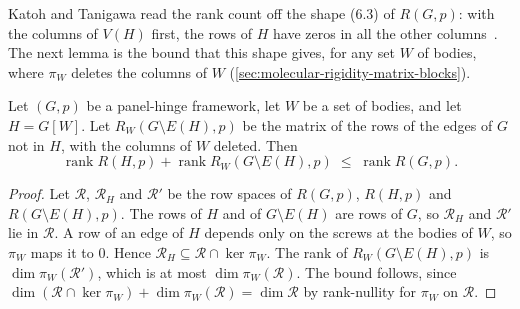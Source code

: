 Katoh and Tanigawa read the rank count off the shape (6.3) of
$R(G,p)$: with the columns of $V(H)$ first, the rows of $H$ have zeros
in all the other columns~\cite[pp.~673--674]{katohTanigawa2011}. The
next lemma is the bound that this shape gives, for any set $W$ of
bodies, where $\pi_W$ deletes the columns of $W$
(\cref{sec:molecular-rigidity-matrix-blocks}).

\begin{lemma}
  \label{lem:block-rank-contract}
  \leanok
  Let $(G,p)$ be a panel-hinge framework, let $W$ be a set of bodies, and
  let $H = G[W]$. Let $R_W(G \setminus E(H), p)$ be the matrix of the rows
  of the edges of $G$ not in $H$, with the columns of $W$ deleted. Then
  \[
    \operatorname{rank} R(H, p) + \operatorname{rank} R_W(G \setminus E(H), p)
    \;\le\; \operatorname{rank} R(G, p).
  \]
\end{lemma}
\begin{proof}
  \leanok
  Let $\mathcal R$, $\mathcal R_H$ and $\mathcal R'$ be the row spaces of
  $R(G,p)$, $R(H,p)$ and $R(G \setminus E(H), p)$. The rows of $H$ and of
  $G \setminus E(H)$ are rows of $G$, so $\mathcal R_H$ and $\mathcal R'$
  lie in $\mathcal R$. A row of an edge of $H$ depends only on the screws
  at the bodies of $W$, so $\pi_W$ maps it to $0$. Hence
  $\mathcal R_H \subseteq \mathcal R \cap \ker \pi_W$. The rank of
  $R_W(G \setminus E(H), p)$ is $\dim \pi_W(\mathcal R')$, which is at
  most $\dim \pi_W(\mathcal R)$. The bound follows, since
  $\dim(\mathcal R \cap \ker \pi_W) + \dim \pi_W(\mathcal R)
  = \dim \mathcal R$ by rank-nullity for $\pi_W$ on $\mathcal R$.
\end{proof}


